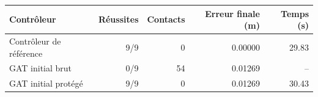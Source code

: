 \begin{tabular}{lrrrr}
\toprule
Contrôleur & Réussites & Contacts & Erreur finale (m) & Temps (s)\\\midrule
Contrôleur de référence & 9/9 & 0 & 0.00000 & 29.83 \\
GAT initial brut & 0/9 & 54 & 0.01269 & -- \\
GAT initial protégé & 9/9 & 0 & 0.01269 & 30.43 \\
\bottomrule\end{tabular}
